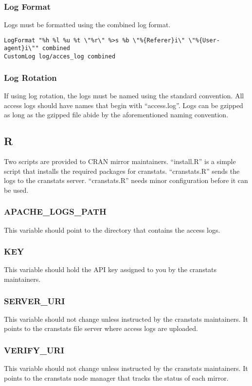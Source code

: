 \documentclass[12pt, titlepage]{article}
\begin{document}
\subsubsection{Log Format}
Logs must be formatted using the combined log format.
\begin{verbatim}
LogFormat "%h %l %u %t \"%r\" %>s %b \"%{Referer}i\" \"%{User-agent}i\"" combined
CustomLog log/acces_log combined
\end{verbatim}
\subsubsection{Log Rotation}
If using log rotation, the logs must be named using the standard convention. All access logs should have names that begin with ``access.log''. Logs can be gzipped as long as the gzipped file abide by the aforementioned naming convention.

\subsection{R}
Two scripts are provided to CRAN mirror maintainers. ``install.R'' is a simple script that installs the required packages for cranstats. ``cranstats.R'' sends the logs to the cranstats server. ``cranstats.R'' needs minor configuration before it can be used.
\subsubsection{APACHE\_LOGS\_PATH}
This variable should point to the directory that contains the access logs.
\subsubsection{KEY}
This variable should hold the API key assigned to you by the cranstats maintainers.
\subsubsection{SERVER\_URI}
This variable should not change unless instructed by the cranstats maintainers. It points to the cranstats file server where access logs are uploaded.
\subsubsection{VERIFY\_URI}
This variable should not change unless instructed by the cranstats maintainers. It points to the cranstats node manager that tracks the status of each mirror.
\end{document}
